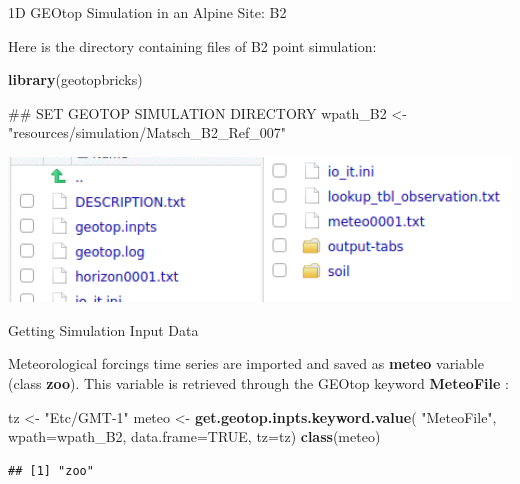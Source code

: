\documentclass[ignorenonframetext,]{beamer}
\newenvironment{Shaded}{\begin{snugshade}}{\end{snugshade}}
\newcommand{\KeywordTok}[1]{\textcolor[rgb]{0.13,0.29,0.53}{\textbf{#1}}}
\newcommand{\DataTypeTok}[1]{\textcolor[rgb]{0.13,0.29,0.53}{#1}}
\newcommand{\StringTok}[1]{\textcolor[rgb]{0.31,0.60,0.02}{#1}}
\newcommand{\OtherTok}[1]{\textcolor[rgb]{0.56,0.35,0.01}{#1}}
\newcommand{\NormalTok}[1]{#1}
\begin{document}
\begin{frame}[fragile]{1D GEOtop Simulation in an Alpine Site: B2}

Here is the directory containing files of B2 point simulation:

\begin{Shaded}
\begin{Highlighting}[]
\KeywordTok{library}\NormalTok{(geotopbricks) }

\NormalTok{## SET GEOTOP SIMULATION DIRECTORY}
\NormalTok{wpath_B2 <-}\StringTok{ "resources/simulation/Matsch_B2_Ref_007"} 
\end{Highlighting}
\end{Shaded}

\includegraphics[width=1.00000\textwidth]{resources/images/geotop_folder_B2.png}\\

\end{frame}

\begin{frame}[fragile]{Getting Simulation Input Data}

Meteorological forcings time series are imported and saved as
\textbf{meteo} variable (class \textbf{zoo}). This variable is retrieved
through the GEOtop keyword \textbf{MeteoFile} :

\begin{Shaded}
\begin{Highlighting}[]
\NormalTok{tz <-}\StringTok{ "Etc/GMT-1"}
\NormalTok{meteo <-}\StringTok{ }\KeywordTok{get.geotop.inpts.keyword.value}\NormalTok{(}
  \StringTok{"MeteoFile"}\NormalTok{,}
  \DataTypeTok{wpath=}\NormalTok{wpath_B2,}
  \DataTypeTok{data.frame=}\OtherTok{TRUE}\NormalTok{,}
  \DataTypeTok{tz=}\NormalTok{tz)}
\KeywordTok{class}\NormalTok{(meteo)}
\end{Highlighting}
\end{Shaded}

\begin{verbatim}
## [1] "zoo"
\end{verbatim}

\end{frame}
\end{document}
